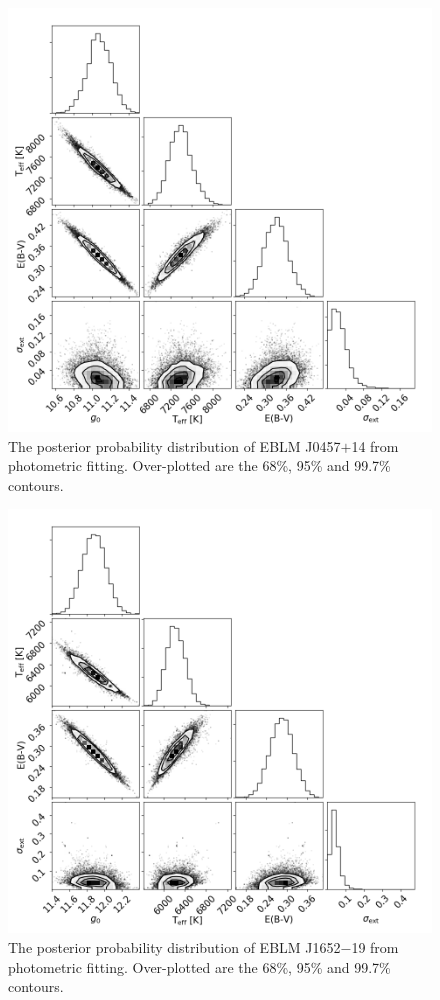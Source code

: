 \begin{figure}
    \centering
    \includegraphics[scale=0.5]{Appendix/SED_fits/J0457+14.png}
    \caption{The posterior probability distribution of EBLM J0457$+$14 from photometric fitting. Over-plotted are the 68\%, 95\% and 99.7\% contours.}
    \label{methods:fig:SED_J0457+14}
\end{figure}

\begin{figure}
    \centering
    \includegraphics[scale=0.5]{Appendix/SED_fits/J1652-19.png}
    \caption{The posterior probability distribution of EBLM J1652$-$19 from photometric fitting. Over-plotted are the 68\%, 95\% and 99.7\% contours.}
    \label{methods:fig:SED_J1652-19}
\end{figure}

